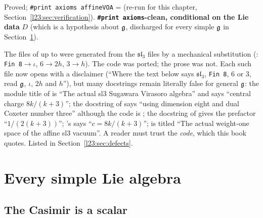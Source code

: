 \begin{status}
Proved; \texttt{\#print axioms affineVOA} =  (re-run for this chapter,
Section~\ref{l23:sec:verification}). \textbf{\texttt{\#print axioms}-clean, conditional on the Lie data} $D$ (which is a
hypothesis about $\mathfrak g$, discharged for every simple $\mathfrak g$ in Section~\ref{l23:sec:everysimple}).
\end{status}

\begin{warning}[title={Trap: The general files keep $\mathfrak{sl}_3$ docstrings}]\label{l23:warn:sl3docs}
The files of  up to  were generated from the
$\mathfrak{sl}_3$ files  by a mechanical substitution
(: \texttt{Fin 8}$\to\iota$,
$6\to2h$, $3\to h$). The code was ported; the prose was not. Each such file now opens with a disclaimer (``Where the text
below says $\mathfrak{sl}_3$, \texttt{Fin 8}, 6 or 3, read $\mathfrak g$, $\iota$, $2h$ and $h$''), but many docstrings remain
literally false for general $\mathfrak g$: the module title of  is ``The actual sl3 Sugawara Virasoro
algebra'' and says ``central charge $8k/(k+3)$''; the docstring of  says ``using dimension eight and
dual Coxeter number three'' although the code is ; the docstring of
 gives the prefactor ``$1/(2(k+3))$''; 's says ``$c = 8k/(k+3)$''; 
is titled ``The actual weight-one space of the affine sl3 vacuum''. A reader must trust the \emph{code}, which this book
quotes. Listed in Section~\ref{l23:sec:defects}.
\end{warning}

\section{Every simple Lie algebra}\label{l23:sec:everysimple}

\subsection{The Casimir is a scalar}

